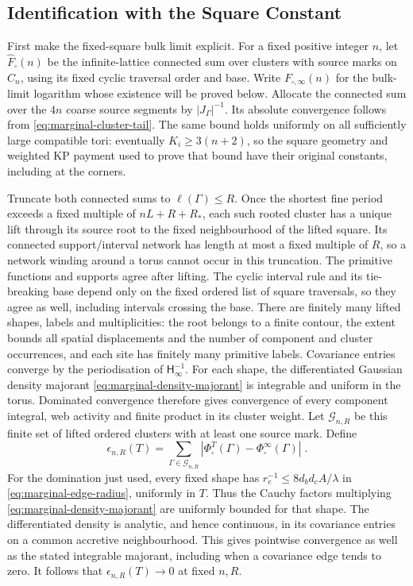 \documentclass[11pt]{article}
\begin{document}
\subsection{Identification with the Square Constant}

First make the fixed-square bulk limit explicit. For a fixed positive integer $n$, let $\widehat F_\square(n)$ be the infinite-lattice connected sum over clusters with source marks on $C_n$, using its fixed cyclic traversal order and base. Write $F_{\square,\infty}(n)$ for the bulk-limit logarithm whose existence will be proved below. Allocate the connected sum over the $4n$ coarse source segments by $|J_\Gamma|^{-1}$. Its absolute convergence follows from \eqref{eq:marginal-cluster-tail}. The same bound holds uniformly on all sufficiently large compatible tori: eventually $K_i\geq 3(n+2)$, so the square geometry and weighted KP payment used to prove that bound have their original constants, including at the corners.

Truncate both connected sums to $\ell(\Gamma)\leq R$. Once the shortest fine period exceeds a fixed multiple of $nL+R+R_*$, each such rooted cluster has a unique lift through its source root to the fixed neighbourhood of the lifted square. Its connected support/interval network has length at most a fixed multiple of $R$, so a network winding around a torus cannot occur in this truncation. The primitive functions and supports agree after lifting. The cyclic interval rule and its tie-breaking base depend only on the fixed ordered list of square traversals, so they agree as well, including intervals crossing the base. There are finitely many lifted shapes, labels and multiplicities: the root belongs to a finite contour, the extent bounds all spatial displacements and the number of component and cluster occurrences, and each site has finitely many primitive labels. Covariance entries converge by the periodisation of $\mathsf H_\infty^{-1}$. For each shape, the differentiated Gaussian density majorant \eqref{eq:marginal-density-majorant} is integrable and uniform in the torus. Dominated convergence therefore gives convergence of every component integral, web activity and finite product in its cluster weight. Let $\mathscr G_{n,R}$ be this finite set of lifted ordered clusters with at least one source mark. Define
\begin{equation}\label{eq:corner-finite-shape-difference}
    \epsilon_{n,R}(T)=\sum_{\Gamma\in\mathscr G_{n,R}}
        |\Phi_\square^T(\Gamma)-\Phi_\square^\infty(\Gamma)|\;.
\end{equation}
For the domination just used, every fixed shape has $r_e^{-1}\leq 8d_bd_cA/\lambda$ in \eqref{eq:marginal-edge-radius}, uniformly in $T$. Thus the Cauchy factors multiplying \eqref{eq:marginal-density-majorant} are uniformly bounded for that shape. The differentiated density is analytic, and hence continuous, in its covariance entries on a common accretive neighbourhood. This gives pointwise convergence as well as the stated integrable majorant, including when a covariance edge tends to zero. It follows that $\epsilon_{n,R}(T)\to 0$ at fixed $n,R$.
\end{document}
